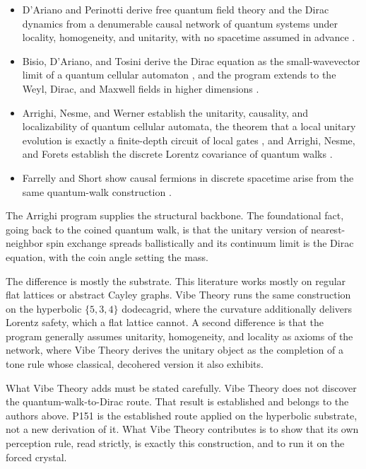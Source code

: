 \begin{itemize}
\item D'Ariano and Perinotti derive free quantum field theory and the
Dirac dynamics from a denumerable causal network of quantum systems under locality, homogeneity, and
unitarity, with no spacetime assumed in advance \cite{dariano2014}.
\item Bisio, D'Ariano, and Tosini derive the
Dirac equation as the small-wavevector limit of a quantum cellular automaton \cite{bisio2015}, and the program
extends to the Weyl, Dirac, and Maxwell fields in higher dimensions \cite{bisio2016}.
\item Arrighi, Nesme, and Werner establish the unitarity, causality, and
localizability of quantum cellular automata, the theorem that a local unitary evolution is exactly a
finite-depth circuit of local gates \cite{arrighi2011}, and Arrighi, Nesme, and Forets establish the discrete
Lorentz covariance of quantum walks \cite{arrighi2014}.
\item Farrelly and Short show causal fermions in discrete
spacetime arise from the same quantum-walk construction \cite{farrelly2014}.
\end{itemize}

The Arrighi program supplies the structural backbone. The foundational fact, going back
to the coined quantum walk, is that the unitary version of nearest-neighbor spin exchange spreads ballistically
and its continuum limit is the Dirac equation, with the coin angle setting the mass.

The difference is mostly the substrate. This literature works mostly on regular flat lattices or abstract
Cayley graphs. Vibe Theory runs the same construction on the hyperbolic $\{5,3,4\}$ dodecagrid, where the
curvature additionally delivers Lorentz safety, which a flat lattice cannot. A second difference is that the
program generally assumes unitarity, homogeneity, and locality as axioms of the network, where Vibe Theory
derives the unitary object as the completion of a tone rule whose classical, decohered version it also
exhibits.

What Vibe Theory adds must be stated carefully. Vibe Theory does not discover the quantum-walk-to-Dirac route.
That result is established and belongs to the authors above. P151 is the established route applied on the
hyperbolic substrate, not a new derivation of it. What Vibe Theory contributes is to show that its own
perception rule, read strictly, is exactly this construction, and to run it on the forced crystal.

